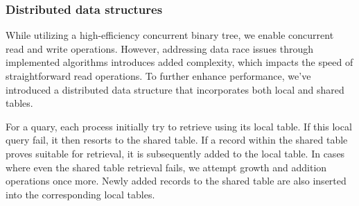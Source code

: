 \subsubsection{Distributed data structures}


While utilizing a high-efficiency concurrent binary tree, we enable concurrent read and write operations. However, addressing data race issues through implemented algorithms introduces added complexity, which impacts the speed of straightforward read operations. To further enhance performance, we've introduced a distributed data structure that incorporates both local and shared tables.

For a quary, each process initially try to retrieve using its local table. If this local query fail, it then resorts to the shared table. If a record within the shared table proves suitable for retrieval, it is subsequently added to the local table. In cases where even the shared table retrieval fails, we attempt growth and addition operations once more. Newly added records to the shared table are also inserted into the corresponding local tables.

